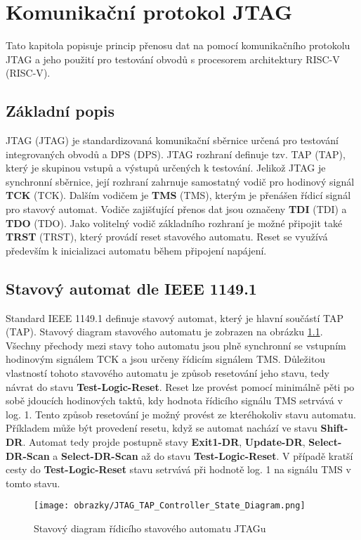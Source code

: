 \chapter{Komunikační protokol JTAG}
Tato kapitola popisuje princip přenosu dat na pomocí komunikačního protokolu JTAG a jeho použití pro testování obvodů s procesorem architektury \acs{RISC-V} (\acl{RISC-V}).

\section{Základní popis}
\acs{JTAG} (\acl{JTAG}) je standardizovaná komunikační sběrnice určená pro testování integrovaných obvodů a \acs{DPS} (\acl{DPS}).
\acs{JTAG} rozhraní definuje tzv. \acs{TAP} (\acl{TAP}), který je skupinou vstupů a výstupů určených k testování. Jelikož \acs{JTAG} je synchronní sběrnice, její rozhraní zahrnuje samostatný vodič pro hodinový signál \textbf{\acs{TCK}} (\acl{TCK}). Dalším vodičem je \textbf{\acs{TMS}} (\acl{TMS}), kterým je přenášen řídicí signál pro stavový automat. Vodiče zajišťující přenos dat jsou označeny \textbf{\acs{TDI}} (\acl{TDI}) a \textbf{\acs{TDO}} (\acl{TDO}). Jako volitelný vodič základního rozhraní je možné připojit také \textbf{\acs{TRST}} (\acl{TRST}), který provádí reset stavového automatu. Reset se využívá především k inicializaci automatu během připojení napájení. \cite {IEEE_1149-1} \cite{JTAG}      

\section{Stavový automat dle IEEE 1149.1}
Standard IEEE 1149.1 definuje stavový automat, který je hlavní součástí \acs{TAP} (\acl{TAP}). Stavový diagram stavového automatu je zobrazen na obrázku \ref{fig:tap_controller}. Všechny přechody mezi stavy toho automatu jsou plně synchronní se vstupním hodinovým signálem \acs{TCK} a jsou určeny řídicím signálem \acs{TMS}. Důležitou vlastností tohoto stavového automatu je způsob resetování jeho stavu, tedy návrat do stavu \textbf{Test-Logic-Reset}. Reset lze provést pomocí minimálně pěti po sobě jdoucích hodinových taktů, kdy hodnota řídicího signálu \acs{TMS} setrvává v log. 1. Tento způsob resetování je možný provést ze kteréhokoliv stavu automatu. Příkladem může být provedení resetu, když se automat nachází ve stavu \textbf{Shift-DR}. Automat tedy projde postupně stavy \textbf{Exit1-DR}, \textbf{Update-DR}, \textbf{Select-DR-Scan} a \textbf{Select-DR-Scan} až do stavu \textbf{Test-Logic-Reset}. V případě kratší cesty do \textbf{Test-Logic-Reset} stavu setrvává při hodnotě log. 1 na signálu \acs{TMS} v tomto stavu.
\begin{figure}[!h]
  \begin{center}
    \texttt{[image: obrazky/JTAG\_TAP\_Controller\_State\_Diagram.png]}
  \end{center}
  \caption{Stavový diagram řídicího stavového automatu JTAGu \cite{JTAG_TAP_diagram}}
	\label{fig:tap_controller}
\end{figure}

